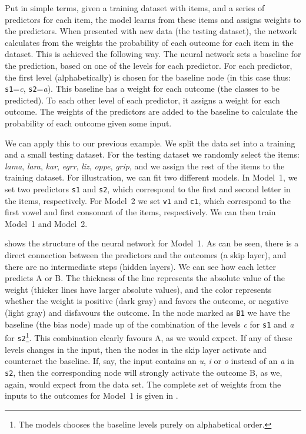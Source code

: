 Put in simple terms, given a training dataset with items, and a series of predictors for each item, the  model learns from these items and assigns weights to the predictors. When presented with new data (the testing dataset), the network calculates from the weights the probability of each outcome for each item in the dataset. This is achieved the following way. The neural network sets a baseline for the prediction, based on one of the levels for each predictor. For each predictor, the first level (alphabetically) is chosen for the baseline node (in this case thus: \texttt{s1}=\textit{c}, \texttt{s2}=\textit{a}). This baseline has a weight for each outcome (the classes to be predicted). To each other level of each predictor, it assigns a weight for each outcome. The weights of the predictors are added to the baseline to calculate the probability of each outcome given some input.

We can apply this to our previous example. We split the data set into a training and a small testing dataset. For the testing dataset we randomly select the items: \textit{lama}, \textit{lara}, \textit{kar}, \textit{egrr}, \textit{liz}, \textit{oppe}, \textit{grip}, and we assign the rest of the items to the training dataset. For illustration, we can fit two different models. In Model~1, we set two predictors \texttt{s1} and \texttt{s2}, which correspond to the first and second letter in the items, respectively. For Model~2 we set \texttt{v1} and \texttt{c1}, which correspond to the first vowel and first consonant of the items, respectively. We can then train Model~1 and Model~2.

 shows the structure of the neural network for Model~1. As can be seen, there is a direct connection between the predictors and the outcomes (a skip layer), and there are no intermediate steps (hidden layers). We can see how each letter predicts A or B. The thickness of the line represents the absolute value of the weight (thicker lines have larger absolute values), and the color represents whether the weight is positive (dark gray) and favors the outcome, or negative (light gray) and disfavours the outcome. In the node marked as \texttt{B1} we have the baseline (the bias node) made up of the combination of the levels \textit{c} for \texttt{s1} and \textit{a} for \texttt{s2}\footnote{The models chooses the baseline levels purely on alphabetical order.}. This combination clearly favours A, as we would expect. If any of these levels changes in the input, then the nodes in the skip layer activate and counteract the baseline. If, say, the input contains an \textit{u}, \textit{i} or \textit{o} instead of an \textit{a} in \texttt{s2}, then the corresponding node will strongly activate the outcome B, as we, again, would expect from the data set. The complete set of weights from the inputs to the outcomes for Model~1 is given in .

